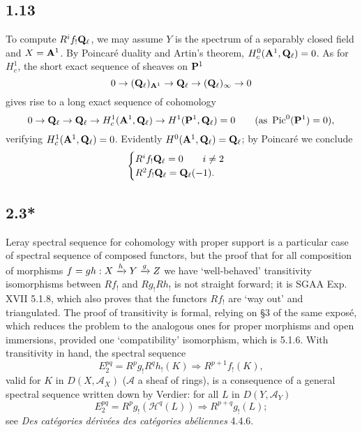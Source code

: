 \documentclass[deligne.tex]{subfiles}
\begin{document}
\subsection*{1.13}
To compute $R^if_!\mathbf{Q}_\ell$, we may assume $Y$ is the spectrum of a 
separably closed field and $X=\mathbf{A}^1$. By Poincaré duality and Artin's 
theorem, $H^0_c(\mathbf{A}^1,\mathbf{Q}_\ell)=0$. As for $H^1_c$, the short exact sequence
of sheaves on $\mathbf{P}^1$
\begin{equation*}
	0\rightarrow(\mathbf{Q}_\ell)_{\mathbf{A}^1}\rightarrow\mathbf{Q}_\ell\rightarrow(\mathbf{Q}_\ell)_\infty\rightarrow0
\end{equation*}
gives rise to a long exact sequence of cohomology
\begin{equation*}
	0\rightarrow\mathbf{Q}_\ell\rightarrow\mathbf{Q}_\ell\rightarrow H^1_c(\mathbf{A}^1,\mathbf{Q}_\ell)\rightarrow H^1(\mathbf{P}^1,\mathbf{Q}_\ell)=0\qquad(\text{as }\operatorname{Pic}^0(\mathbf{P}^1)=0),
\end{equation*}
verifying $H^1_c(\mathbf{A}^1,\mathbf{Q}_\ell)=0$.
Evidently $H^0(\mathbf{A}^1,\mathbf{Q}_\ell)=\mathbf{Q}_\ell$; by Poincaré we conclude
\begin{equation*}
	\begin{cases}
	R^if_!\mathbf{Q}_\ell=0\qquad i\ne2 \\
	R^2f_!\mathbf{Q}_\ell=\mathbf{Q}_\ell(-1).
\end{cases}\end{equation*}

\subsection*{2.3*} Leray spectral sequence for cohomology with proper 
support is a particular case of spectral sequence of composed functors,
but the proof that for all composition of morphisms $f=gh:X\xrightarrow h Y\xrightarrow g Z$
we have `well-behaved' transitivity isomorphisms between $Rf_!$ and
$Rg_!Rh_!$ is not straight forward; it is SGAA Exp. XVII 5.1.8, which also
proves that the functors $Rf_!$ are `way out' and triangulated.
The proof of transitivity is formal, relying on \S3 of the same exposé,
which reduces the problem to the analogous ones for proper morphisms and
open immersions, provided one `compatibility' isomorphism, which is 5.1.6.
With transitivity in hand, the spectral sequence
\begin{equation*}
	E_2^{pq}=R^pg_!R^qh_!(K)\Rightarrow R^{p+1}f_!(K),
\end{equation*}
valid for $K$ in $D(X,\mathscr A_X)$ ($\mathscr A$ a sheaf of rings), is
a consequence of a general spectral sequence written down by Verdier:
for all $L$ in $D(Y,\mathscr A_Y)$
\begin{equation*}
	E_2^{pq}=R^pg_!(\mathscr H^q(L))\Rightarrow R^{p+q}g_!(L);
\end{equation*}
see \emph{Des catégories dérivées des catégories abéliennes} 4.4.6.
\end{document}
